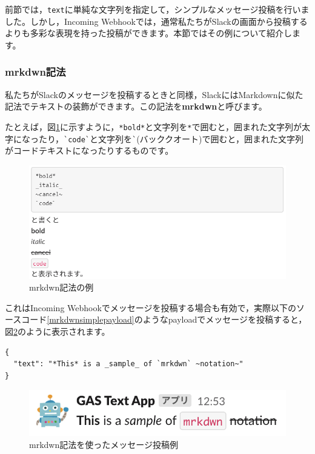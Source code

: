 \documentclass[uplatex,a4j]{jsarticle}
\begin{document}
前節では，\verb|text|に単純な文字列を指定して，シンプルなメッセージ投稿を行いました。しかし，Incoming Webhookでは，通常私たちがSlackの画面から投稿するよりも多彩な表現を持った投稿ができます。本節ではその例について紹介します。

\subsubsection{mrkdwn記法}


私たちがSlackのメッセージを投稿するときと同様，SlackにはMarkdownに似た記法でテキストの装飾ができます。この記法を\textbf{mrkdwn}と呼びます。


たとえば，図\ref{fig:mrkdwn_sample}に示すように，\verb|*bold*|と文字列を\verb|*|で囲むと，囲まれた文字列が太字になったり，\verb|`code`|と文字列を\verb|`|(バッククオート)で囲むと，囲まれた文字列がコードテキストになったりするものです。

\begin{figure}[H]
 \centering
 \includegraphics[keepaspectratio, scale=0.8]{images/mrkdwn_sample.png}
 \caption{mrkdwn記法の例}
 \label{fig:mrkdwn_sample}
\end{figure}

これはIncoming Webhookでメッセージを投稿する場合も有効で，実際以下のソースコード\ref{mrkdwnsimplepayload}のようなpayloadでメッセージを投稿すると，図\ref{fig:mrkdwn_payload1}のように表示されます。

\begin{lstlisting}[basicstyle=\ttfamily\footnotesize,frame=single,caption=mrkdwn payload sample,label=mrkdwnsimplepayload]
{
  "text": "*This* is a _sample_ of `mrkdwn` ~notation~"
}
\end{lstlisting}

\begin{figure}[H]
 \centering
 \includegraphics[keepaspectratio, scale=0.8]{images/mrkdwn_payload1.png}
 \caption{mrkdwn記法を使ったメッセージ投稿例}
 \label{fig:mrkdwn_payload1}
\end{figure}
\end{document}
